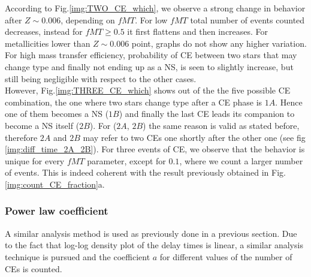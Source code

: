\documentclass[preprint,12pt]{elsarticle}
\begin{document}
According to Fig.\ref{img:TWO_CE_which}, we observe a strong change in behavior after $Z \sim 0.006$, depending on $fMT$. For low $fMT$ total number of events counted decreases, instead for $fMT \geqslant 0.5$ it first flattens and then increases. For metallicities lower than $Z \sim 0.006$ point, graphs do not show any higher variation. For high mass transfer efficiency, probability of CE between two stars that may change type and finally not ending up as a NS, is seen to slightly increase, but still being negligible with respect to the other cases.\\
However, Fig.\ref{img:THREE_CE_which} shows out of the the five possible CE combination, the one where two stars change type after a CE phase is $1A$. Hence one of them becomes a NS ($1B$) and finally the last CE leads its companion to become a NS itself ($2B$). For ($2A$, $2B$) the same reason is valid as stated before, therefore $2A$ and $2B$ may refer to two CEs one shortly after the other one (see fig \ref{img:diff_time_2A_2B}). For three events of CE, we observe that the behavior is unique for every $fMT$ parameter, except for $0.1$, where we count a larger number of events. This is indeed coherent with the result previously obtained in Fig.\ref{img:count_CE_fraction}a.\\ 

\subsubsection{\textbf{Power law coefficient}}

A similar analysis method is used as previously done in a previous section. Due to the fact that log-log density plot of the delay times is linear, a similar analysis technique is pursued and the coefficient $a$ for different values of the number of CEs is counted. 
\end{document}
